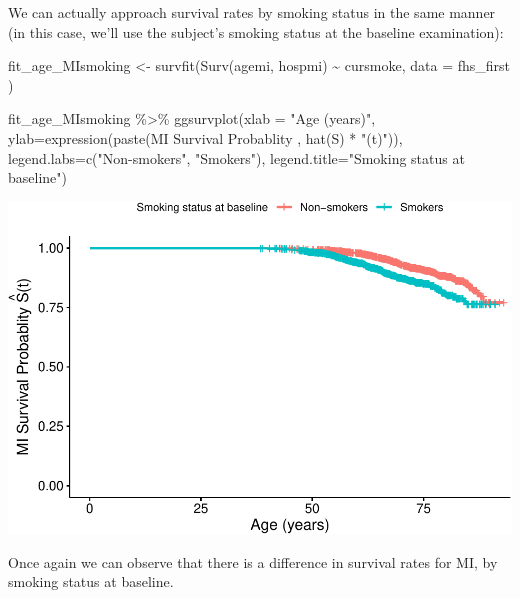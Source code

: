 \documentclass[
]{book}
\newenvironment{Shaded}{\begin{snugshade}}{\end{snugshade}}
\newcommand{\AttributeTok}[1]{\textcolor[rgb]{0.77,0.63,0.00}{#1}}
\newcommand{\FunctionTok}[1]{\textcolor[rgb]{0.00,0.00,0.00}{#1}}
\newcommand{\NormalTok}[1]{#1}
\newcommand{\OtherTok}[1]{\textcolor[rgb]{0.56,0.35,0.01}{#1}}
\newcommand{\SpecialCharTok}[1]{\textcolor[rgb]{0.00,0.00,0.00}{#1}}
\newcommand{\StringTok}[1]{\textcolor[rgb]{0.31,0.60,0.02}{#1}}
\begin{document}
We can actually approach survival rates by smoking status in the same manner (in this case, we'll use the subject's smoking status at the baseline examination):

\begin{Shaded}
\begin{Highlighting}[]
\NormalTok{fit\_age\_MIsmoking }\OtherTok{\textless{}{-}} \FunctionTok{survfit}\NormalTok{(}\FunctionTok{Surv}\NormalTok{(agemi, hospmi) }\SpecialCharTok{\textasciitilde{}}\NormalTok{ cursmoke, }\AttributeTok{data =}\NormalTok{ fhs\_first )}

\NormalTok{fit\_age\_MIsmoking }\SpecialCharTok{\%\textgreater{}\%}
\FunctionTok{ggsurvplot}\NormalTok{(}\AttributeTok{xlab =} \StringTok{"Age (years)"}\NormalTok{,}
           \AttributeTok{ylab=}\FunctionTok{expression}\NormalTok{(}\FunctionTok{paste}\NormalTok{(}\StringTok{\textquotesingle{}MI Survival Probablity \textquotesingle{}}\NormalTok{, }
                                 \FunctionTok{hat}\NormalTok{(S) }\SpecialCharTok{*} \StringTok{"(t)"}\NormalTok{)), }
           \AttributeTok{legend.labs=}\FunctionTok{c}\NormalTok{(}\StringTok{"Non{-}smokers"}\NormalTok{, }\StringTok{"Smokers"}\NormalTok{),}
           \AttributeTok{legend.title=}\StringTok{"Smoking status at baseline"}\NormalTok{)}
\end{Highlighting}
\end{Shaded}

\includegraphics{adv_epi_analysis_files/figure-latex/unnamed-chunk-205-1.pdf}

Once again we can observe that there is a difference in survival rates for MI, by smoking status at baseline.
\end{document}
